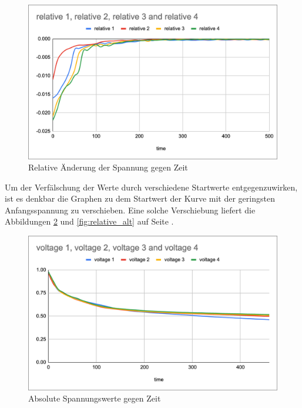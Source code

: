 \documentclass[11pt]{article}
\begin{document}
\begin{figure}[h!]
    \caption{Relative Änderung der Spannung gegen Zeit}
    \label{fig:relative}
    \centering
    \includegraphics[scale=0.25]{relative.png}
\end{figure}
\newpage
\noindent
Um der Verfälschung der Werte durch verschiedene Startwerte entgegenzuwirken, ist es denkbar die Graphen zu dem Startwert der Kurve mit der geringsten Anfangsspannung zu verschieben. Eine solche Verschiebung liefert die Abbildungen \ref{fig:absolute_alt} und \ref{fig:relative_alt} auf Seite \pageref{fig:absolute_alt}.

\begin{figure}[h!]
    \caption{Absolute Spannungswerte gegen Zeit}
    \label{fig:absolute_alt}
    \centering
    \includegraphics[scale=0.25]{absolute_alt.png}
\end{figure}
\end{document}
